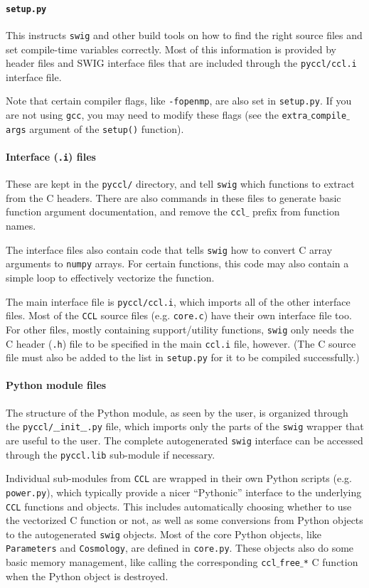 \documentclass[\docopts]{\docclass}
\begin{document}
\paragraph{{\tt setup.py}} This instructs {\tt swig} and other build tools on how to find the right source files and set compile-time variables correctly. Most of this information is provided by header files and SWIG interface files that are included through the {\tt pyccl/ccl.i} interface file.

Note that certain compiler flags, like {\tt -fopenmp}, are also set in {\tt setup.py}. If you are not using {\tt gcc}, you may need to modify these flags (see the {\tt extra$\_$compile$\_$args} argument of the {\tt setup()} function).

\paragraph{Interface ({\tt .i}) files} These are kept in the {\tt pyccl/} directory, and tell {\tt swig} which functions to extract from the C headers. There are also commands in these files to generate basic function argument documentation, and remove the {\tt ccl$\_$} prefix from function names.

The interface files also contain code that tells {\tt swig} how to convert C array arguments to {\tt numpy} arrays. For certain functions, this code may also contain a simple loop to effectively vectorize the function.

The main interface file is {\tt pyccl/ccl.i}, which imports all of the other interface files. Most of the {\tt CCL} source files (e.g. {\tt core.c}) have their own interface file too. For other files, mostly containing support/utility functions, {\tt swig} only needs the C header ({\tt .h}) file to be specified in the main {\tt ccl.i} file, however. (The C source file must also be added to the list in {\tt setup.py} for it to be compiled successfully.)

\paragraph{Python module files} The structure of the Python module, as seen by the user, is organized through the {\tt pyccl/$\_$$\_$init$\_$$\_$.py} file, which imports only the parts of the {\tt swig} wrapper that are useful to the user. The complete autogenerated {\tt swig} interface can be accessed through the {\tt pyccl.lib} sub-module if necessary.

Individual sub-modules from {\tt CCL} are wrapped in their own Python scripts (e.g. {\tt power.py}), which typically provide a nicer ``Pythonic'' interface to the underlying {\tt CCL} functions and objects. This includes automatically choosing whether to use the vectorized C function or not, as well as some conversions from Python objects to the autogenerated {\tt swig} objects. Most of the core Python objects, like {\tt Parameters} and {\tt Cosmology}, are defined in {\tt core.py}. These objects also do some basic memory management, like calling the corresponding {\tt ccl$\_$free$\_$*} C function when the Python object is destroyed.
\end{document}
